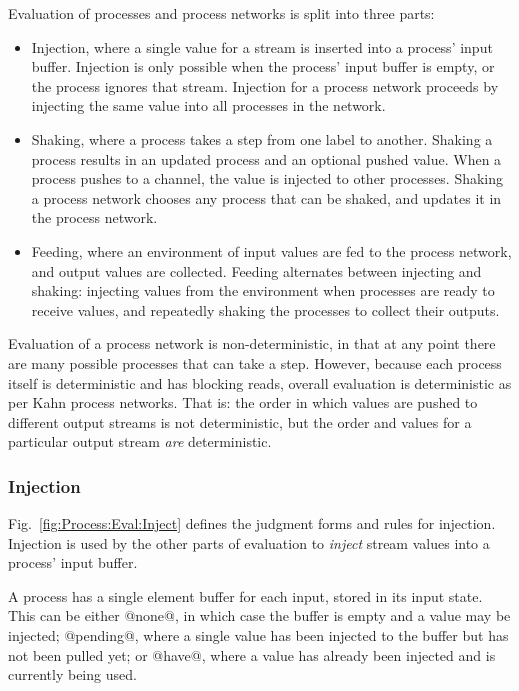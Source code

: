 Evaluation of processes and process networks is split into three parts:
\begin{itemize}
\item Injection, where a single value for a stream is inserted into a process' input buffer.
Injection is only possible when the process' input buffer is empty, or the process ignores that stream.
Injection for a process network proceeds by injecting the same value into all processes in the network.

\item Shaking, where a process takes a step from one label to another.
Shaking a process results in an updated process and an optional pushed value.
When a process pushes to a channel, the value is injected to other processes.
Shaking a process network chooses any process that can be shaked, and updates it in the process network.

\item Feeding, where an environment of input values are fed to the process network, and output values are collected.
Feeding alternates between injecting and shaking: injecting values from the environment when processes are ready to receive values, and repeatedly shaking the processes to collect their outputs.
\end{itemize}

Evaluation of a process network is non-deterministic, in that at any point there are many possible processes that can take a step.
However, because each process itself is deterministic and has blocking reads, overall evaluation is deterministic as per Kahn process networks.
That is: the order in which values are pushed to different output streams is not deterministic, but the order and values for a particular output stream \emph{are} deterministic.


\subsubsection{Injection}
Fig.~\ref{fig:Process:Eval:Inject} defines the judgment forms and rules for injection.
Injection is used by the other parts of evaluation to \emph{inject} stream values into a process' input buffer.

A process has a single element buffer for each input, stored in its input state.
This can be either @none@, in which case the buffer is empty and a value may be injected; @pending@, where a single value has been injected to the buffer but has not been pulled yet; or @have@, where a value has already been injected and is currently being used.

